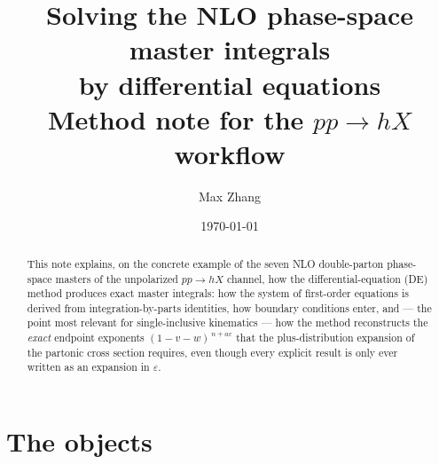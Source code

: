 \documentclass[11pt]{article}
\title{Solving the NLO phase-space master integrals\\
by differential equations\\[1ex]
\large Method note for the $pp \to h X$ workflow}
\author{Max Zhang}
\date{\today}
\newcommand{\eps}{\varepsilon}
\begin{document}
\maketitle

\begin{abstract}
This note explains, on the concrete example of the seven NLO
double-parton phase-space masters of the unpolarized $pp \to hX$
channel, how the differential-equation (DE) method produces exact
master integrals: how the system of first-order equations is derived
from integration-by-parts identities, how boundary conditions enter,
and --- the point most relevant for single-inclusive kinematics ---
how the method reconstructs the \emph{exact} endpoint exponents
$(1-v-w)^{\,n+a\eps}$ that the plus-distribution expansion of the
partonic cross section requires, even though every explicit result is
only ever written as an expansion in $\eps$.
\end{abstract}

\section{The objects}
\label{sec:objects}
\end{document}
